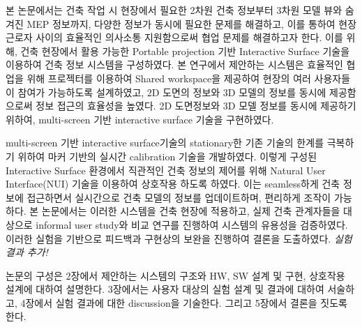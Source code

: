 본 논문에서는 건축 작업 시 현장에서 필요한 2차원 건축 정보부터 3차원 모델 뷰와 숨겨진 MEP 정보까지, 다양한 정보가 동시에 필요한 문제를 해결하고, 이를 통하여 현장 근로자 사이의 효율적인 의사소통 지원함으로써 협업 문제를 해결하고자 한다. 이를 위해, 건축 현장에서 활용 가능한 Portable projection 기반 Interactive Surface 기술을 이용하여 건축 정보 시스템을 구성하였다. 본 연구에서 제안하는 시스템은 효율적인 협업을 위해 프로젝터를 이용하여 Shared workspace을 제공하여 현장의 여러 사용자들이 참여가 가능하도록 설계하였고, 2D 도면의 정보와 3D 모델의 정보를 동시에 제공함으로써 정보 접근의 효율성을 높였다. 2D 도면정보와 3D 모델 정보를 동시에 제공하기 위하여, multi-screen 기반 interactive surface 기술\cite{coram_astrotouch:_2013,weiss_benddesk:_2010,wimmer_curve:_2010,benko_miragetable:_2012}을 구현하였다. 

multi-screen 기반 interactive surface기술의 stationary한 기존 기술의 한계를 극복하기 위하여 마커 기반의 실시간 calibration 기술을 개발하였다. 이렇게 구성된 Interactive Surface 환경에서 직관적인 건축 정보의 제어를 위해 Natural User Interface(NUI) 기술을 이용하여 상호작용 하도록 하였다. 이는 seamless하게 건축 정보에 접근하면서 실시간으로 건축 모델의 정보를 업데이트하며, 편리하게 조작이 가능하다. 
본 논문에서는 이러한 시스템을 건축 현장에 적용하고, 실제 건축 관계자들을 대상으로  informal user study와 비교 연구를 진행하여 시스템의 유용성을 검증하였다. 이러한 실험을 기반으로 피드백과 구현상의 보완을 진행하여 결론을 도출하였다. \textit{실험 결과 추가!}

논문의 구성은 2장에서 제안하는 시스템의 구조와 HW, SW 설계 및 구현, 상호작용 설계에 대하여 설명한다. 3장에서는 사용자 대상의 실험 설계 및 결과에 대하여 서술하고, 4장에서 실험 결과에 대한 discussion을 기술한다. 그리고 5장에서 결론을 짓도록 한다.



